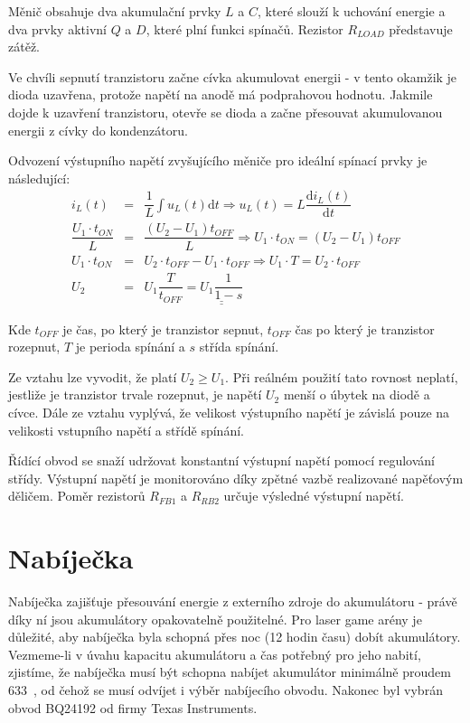 Měnič obsahuje dva akumulační prvky $L$ a $C$, které slouží k uchování energie a dva prvky aktivní $Q$ a $D$, které plní funkci spínačů. Rezistor $R_{LOAD}$ představuje zátěž.

Ve chvíli sepnutí tranzistoru začne cívka akumulovat energii - v tento okamžik je dioda uzavřena, protože napětí na anodě má podprahovou hodnotu. Jakmile dojde k uzavření tranzistoru, otevře se dioda a začne přesouvat akumulovanou energii z cívky do kondenzátoru.

Odvození výstupního napětí zvyšujícího měniče pro ideální spínací prvky je následující:
\begin{eqnarray}
    i_L(t) &=& \dfrac{1}{L} \int u_L(t) \mathrm{d}t \Rightarrow u_L(t) = L \dfrac{\mathrm{d}i_L(t)}{\mathrm{d}t}
    \nonumber\\
    \dfrac{U_1 \cdot t_{ON}}{L} &=& \dfrac{(U_2 - U_1) t_{OFF}}{L} \Rightarrow U_1 \cdot t_{ON} = (U_2 - U_1) t_{OFF}
    \nonumber\\
    U_1 \cdot t_{ON} &=& U_2 \cdot t_{OFF} - U_1 \cdot t_{OFF} \Rightarrow U_1 \cdot T = U_2 \cdot t_{OFF}
    \nonumber\\
    U_2 &=& U_1 \dfrac{T}{t_{OFF}} = \underline{\underline{U_1 \dfrac{1}{1-s}}}
    \nonumber
\end{eqnarray}

Kde $t_{OFF}$ je čas, po který je tranzistor sepnut, $t_{OFF}$ čas po který je tranzistor rozepnut, $T$ je perioda spínání a $s$ střída spínání.

Ze vztahu lze vyvodit, že platí $U_2 \geq U_1$. Při reálném použití tato rovnost neplatí, jestliže je tranzistor trvale rozepnut, je napětí $U_2$ menší o úbytek na diodě a cívce. Dále ze vztahu vyplývá, že velikost výstupního napětí je závislá pouze na velikosti vstupního napětí a střídě spínání.

Řídící obvod se snaží udržovat konstantní výstupní napětí pomocí regulování střídy. Výstupní napětí je monitorováno díky zpětné vazbě realizované napěťovým děličem. Poměr rezistorů $R_{FB1}$ a $R_{RB2}$ určuje výsledné výstupní napětí.

\section{Nabíječka}
Nabíječka zajišťuje přesouvání energie z externího zdroje do akumulátoru - právě díky ní jsou akumulátory opakovatelně použitelné. Pro laser game arény je důležité, aby nabíječka byla schopná přes noc (12 hodin času) dobít akumulátory. Vezmeme-li v úvahu kapacitu akumulátoru a čas potřebný pro jeho nabití, zjistíme, že nabíječka musí být schopna nabíjet akumulátor minimálně proudem 633~, od čehož se musí odvíjet i výběr nabíjecího obvodu. Nakonec byl vybrán obvod BQ24192 od firmy Texas Instruments.

